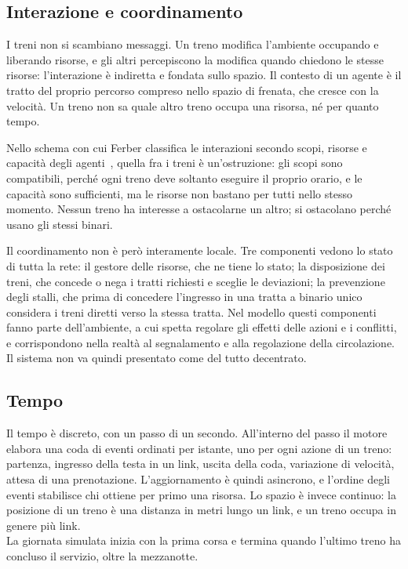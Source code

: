 \subsection{Interazione e coordinamento}
\label{sec:modello-interazione}
I treni non si scambiano messaggi. Un treno modifica l'ambiente occupando e liberando risorse, e gli altri percepiscono la modifica quando chiedono le stesse risorse: l'interazione è indiretta e fondata sullo spazio. Il contesto di un agente è il tratto del proprio percorso compreso nello spazio di frenata, che cresce con la velocità. Un treno non sa quale altro treno occupa una risorsa, né per quanto tempo.

Nello schema con cui Ferber classifica le interazioni secondo scopi, risorse e capacità degli agenti~\cite{ferber1999multiagent}, quella fra i treni è un'ostruzione: gli scopi sono compatibili, perché ogni treno deve soltanto eseguire il proprio orario, e le capacità sono sufficienti, ma le risorse non bastano per tutti nello stesso momento. Nessun treno ha interesse a ostacolarne un altro; si ostacolano perché usano gli stessi binari.

Il coordinamento non è però interamente locale. Tre componenti vedono lo stato di tutta la rete: il gestore delle risorse, che ne tiene lo stato; la disposizione dei treni, che concede o nega i tratti richiesti e sceglie le deviazioni; la prevenzione degli stalli, che prima di concedere l'ingresso in una tratta a binario unico considera i treni diretti verso la stessa tratta. Nel modello questi componenti fanno parte dell'ambiente, a cui spetta regolare gli effetti delle azioni e i conflitti, e corrispondono nella realtà al segnalamento e alla regolazione della circolazione. Il sistema non va quindi presentato come del tutto decentrato.

\subsection{Tempo}
Il tempo è discreto, con un passo di un secondo. All'interno del passo il motore elabora una coda di eventi ordinati per istante, uno per ogni azione di un treno: partenza, ingresso della testa in un link, uscita della coda, variazione di velocità, attesa di una prenotazione. L'aggiornamento è quindi asincrono, e l'ordine degli eventi stabilisce chi ottiene per primo una risorsa. Lo spazio è invece continuo: la posizione di un treno è una distanza in metri lungo un link, e un treno occupa in genere più link. \\
La giornata simulata inizia con la prima corsa e termina quando l'ultimo treno ha concluso il servizio, oltre la mezzanotte.

